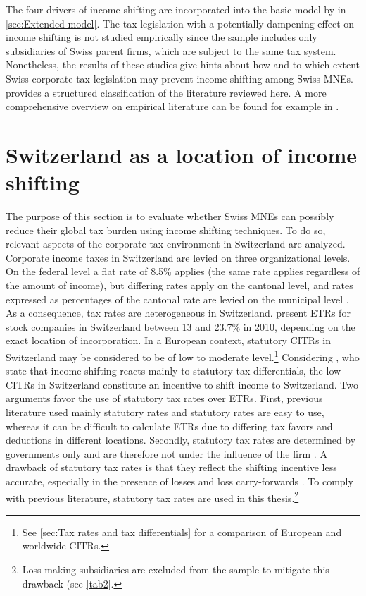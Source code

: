 \documentclass[10pt,twocolumn,oneside,cmyk]{article}
\begin{document}
The four drivers of income shifting are incorporated into the basic model by \textcite{huizinga_international_2008} in \cref{sec:Extended model}. The tax legislation with a potentially dampening effect on income shifting is not studied empirically since the sample includes only subsidiaries of Swiss parent firms, which are subject to the same tax system. Nonetheless, the results of these studies give hints about how and to which extent Swiss corporate tax legislation may prevent income shifting among Swiss MNEs.  provides a structured classification of the literature reviewed here. A more comprehensive overview on empirical literature can be found for example in \textcite{devereux_impact_2007}.

\section{Switzerland as a location of income shifting} \label{sec:Switzerland as a location of income shifting}
The purpose of this section is to evaluate whether Swiss MNEs can possibly reduce their global tax burden using income shifting techniques. To do so, relevant aspects of the corporate tax environment in Switzerland are analyzed. Corporate income taxes in Switzerland are levied on three organizational levels. On the federal level a flat rate of 8.5\% applies (the same rate applies regardless of the amount of income), but differing rates apply on the cantonal level, and rates expressed as percentages of the cantonal rate are levied on the municipal level \parencite[7]{galletta_corporate_2017}. As a consequence, tax rates are heterogeneous in Switzerland. \textcite[18]{lampart_unternehmen_2012} present ETRs for stock companies in Switzerland between 13 and 23.7\% in 2010, depending on the exact location of incorporation. In a European context, statutory CITRs in Switzerland may be considered to be of low to moderate level.\footnote{See \cref{sec:Tax rates and tax differentials} for a comparison of European and worldwide CITRs.} Considering \textcite[307]{haufler_corporate_2000}, who state that income shifting reacts mainly to statutory tax differentials, the low CITRs in Switzerland constitute an incentive to shift income to Switzerland. Two arguments favor the use of statutory tax rates over ETRs. First, previous literature used mainly statutory rates and statutory rates are easy to use, whereas it can be difficult to calculate ETRs due to differing tax favors and deductions in different locations. Secondly, statutory tax rates are determined by governments only and are therefore not under the influence of the firm \parencite[425]{dharmapala_what_2014}. A drawback of statutory tax rates is that they reflect the shifting incentive less accurate, especially in the presence of losses and loss carry-forwards \parencites[16]{overesch_transfer_2006}[74]{buettner_internal_2013}. To comply with previous literature, statutory tax rates are used in this thesis.\footnote{Loss-making subsidiaries are excluded from the sample to mitigate this drawback (see \cref{tab2}.}
\end{document}
